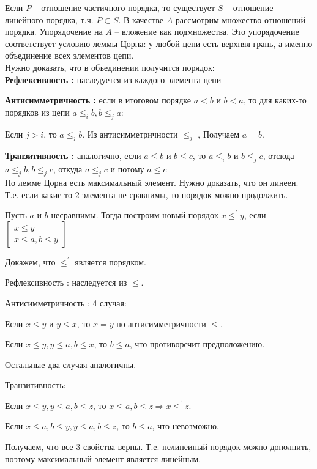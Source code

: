 Если $P$ -- отношение частичного порядка, то существует $S$ -- отношение линейного порядка, т.ч. $P \subset S$. 
В качестве $A$ рассмотрим множество отношений порядка. Упорядочение на $A$ -- вложение как подмножества. 
Это упорядочение соответствует условию леммы Цорна: у любой цепи есть верхняя грань, а именно объединение всех элементов цепи.\\

Нужно доказать, что в объединении получится порядок: \\

\textbf{Рефлексивность :} наследуется из каждого элемента цепи 

\textbf{Антисимметричность :} если в итоговом порядке $a < b$ и $b < a$, то для каких-то порядков из цепи $a \leq_i b, b \leq_j a$:

Если $j > i$, то $a \leq_j b$. Из антисимметричности $\leq_j$ ‚ Получаем $a = b$. 

\textbf{Транзитивность :} аналогично, если $a \leq b$ и $b \leq c$, то $a \leq_i b$ и $b \leq_j c$, отсюда $a \leq_j b, b \leq_j c$, откуда $a \leq_j c$ и потому $a \leq c$\\

По лемме Цорна есть максимальный элемент. Нужно доказать, что он линеен. 
Т.е. если какие-то $2$ элемента не сравнимы, то порядок можно продолжить. 

Пусть $a$ и $b$ несравнимы. 
Тогда построим новый порядок $x \leq^{'} y$, если $\begin{bmatrix}
    x \leq y \\
    x \leq a, b \leq y
\end{bmatrix}$

Докажем, что $\leq^{'}$ является порядком. 

Рефлексивность : наследуется из $\leq$.

Антисимметричность : 4 случая:

Если $x \leq y$ и $y \leq x$, то $x = y$ по антисимметричности $\leq$.

Если $x \leq y, y \leq a, b \leq x$, то $b \leq a$, что противоречит предположению.

Остальные два случая аналогичны.

Транзитивность:

Если $x \leq y, y \leq a, b \leq z$, то $x \leq a, b \leq z \Rightarrow x \leq^{'} z$.

Если $x \leq a, b \leq y, y \leq a, b \leq z$, то $b \leq a$, что невозможно.

Получаем, что все 3 свойства верны. 
Т.е. нелинеиный порядок можно дополнить, поэтому максимальный элемент является линейным.

